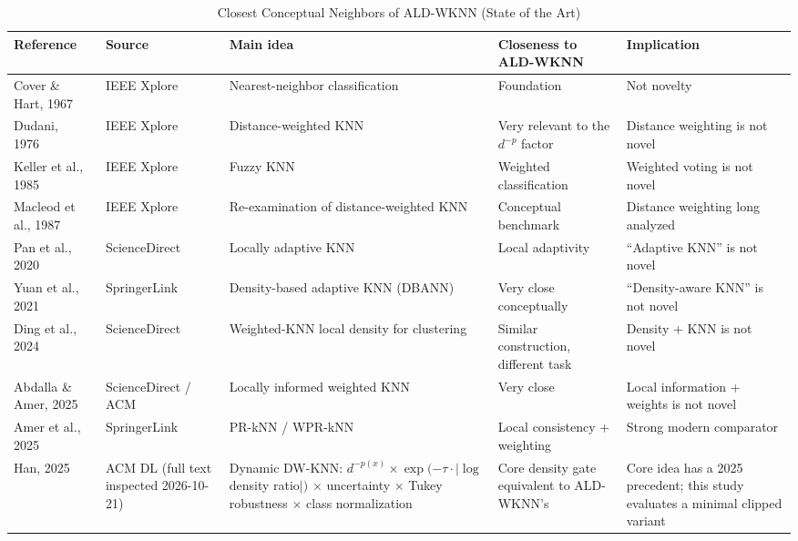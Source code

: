 \documentclass[conference]{IEEEtran}
\begin{document}
\begin{table}[!t]
\centering
\caption{Closest Conceptual Neighbors of ALD-WKNN (State of the Art)}
\label{tab:sota}
\footnotesize
\setlength{\tabcolsep}{5pt}
\begin{tabular}{@{}p{2.3cm}p{2.1cm}p{5.2cm}p{3.0cm}p{3.4cm}@{}}
\toprule
Reference & Source & Main idea & Closeness to ALD-WKNN & Implication \\
\midrule
Cover \& Hart, 1967~\cite{coverhart1967} & IEEE Xplore & Nearest-neighbor classification & Foundation & Not novelty \\
Dudani, 1976~\cite{dudani1976} & IEEE Xplore & Distance-weighted KNN & Very relevant to the $d^{-p}$ factor & Distance weighting is not novel \\
Keller et al., 1985~\cite{keller1985} & IEEE Xplore & Fuzzy KNN & Weighted classification & Weighted voting is not novel \\
Macleod et al., 1987~\cite{macleod1987} & IEEE Xplore & Re-examination of distance-weighted KNN & Conceptual benchmark & Distance weighting long analyzed \\
Pan et al., 2020~\cite{pan2020} & ScienceDirect & Locally adaptive KNN & Local adaptivity & ``Adaptive KNN'' is not novel \\
Yuan et al., 2021~\cite{yuan2021} & SpringerLink & Density-based adaptive KNN (DBANN) & Very close conceptually & ``Density-aware KNN'' is not novel \\
Ding et al., 2024~\cite{ding2024} & ScienceDirect & Weighted-KNN local density for clustering & Similar construction, different task & Density + KNN is not novel \\
Abdalla \& Amer, 2025~\cite{abdalla2025} & ScienceDirect / ACM & Locally informed weighted KNN & Very close & Local information + weights is not novel \\
Amer et al., 2025~\cite{amer2025effective} & SpringerLink & PR-kNN / WPR-kNN & Local consistency + weighting & Strong modern comparator \\
Han, 2025~\cite{dynamicdwknn2025} & ACM DL (full text inspected 2026-10-21) & Dynamic DW-KNN: $d^{-p(x)} \times \exp(-\tau \cdot |\log$ density ratio$|)$ $\times$ uncertainty $\times$ Tukey robustness $\times$ class normalization & Core density gate equivalent to ALD-WKNN's & Core idea has a 2025 precedent; this study evaluates a minimal clipped variant \\
\bottomrule
\end{tabular}
\end{table}
\end{document}
